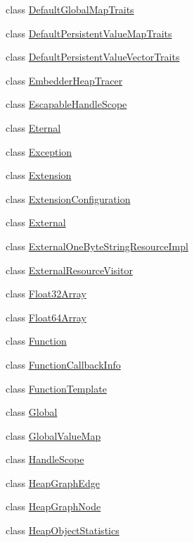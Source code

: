 \begin{DoxyCompactItemize}
\item 
class \hyperlink{classv8_1_1DefaultGlobalMapTraits}{Default\+Global\+Map\+Traits}
\item 
class \hyperlink{classv8_1_1DefaultPersistentValueMapTraits}{Default\+Persistent\+Value\+Map\+Traits}
\item 
class \hyperlink{classv8_1_1DefaultPersistentValueVectorTraits}{Default\+Persistent\+Value\+Vector\+Traits}
\item 
class \hyperlink{classv8_1_1EmbedderHeapTracer}{Embedder\+Heap\+Tracer}
\item 
class \hyperlink{classv8_1_1EscapableHandleScope}{Escapable\+Handle\+Scope}
\item 
class \hyperlink{classv8_1_1Eternal}{Eternal}
\item 
class \hyperlink{classv8_1_1Exception}{Exception}
\item 
class \hyperlink{classv8_1_1Extension}{Extension}
\item 
class \hyperlink{classv8_1_1ExtensionConfiguration}{Extension\+Configuration}
\item 
class \hyperlink{classv8_1_1External}{External}
\item 
class \hyperlink{classv8_1_1ExternalOneByteStringResourceImpl}{External\+One\+Byte\+String\+Resource\+Impl}
\item 
class \hyperlink{classv8_1_1ExternalResourceVisitor}{External\+Resource\+Visitor}
\item 
class \hyperlink{classv8_1_1Float32Array}{Float32\+Array}
\item 
class \hyperlink{classv8_1_1Float64Array}{Float64\+Array}
\item 
class \hyperlink{classv8_1_1Function}{Function}
\item 
class \hyperlink{classv8_1_1FunctionCallbackInfo}{Function\+Callback\+Info}
\item 
class \hyperlink{classv8_1_1FunctionTemplate}{Function\+Template}
\item 
class \hyperlink{classv8_1_1Global}{Global}
\item 
class \hyperlink{classv8_1_1GlobalValueMap}{Global\+Value\+Map}
\item 
class \hyperlink{classv8_1_1HandleScope}{Handle\+Scope}
\item 
class \hyperlink{classv8_1_1HeapGraphEdge}{Heap\+Graph\+Edge}
\item 
class \hyperlink{classv8_1_1HeapGraphNode}{Heap\+Graph\+Node}
\item 
class \hyperlink{classv8_1_1HeapObjectStatistics}{Heap\+Object\+Statistics}

\end{DoxyCompactItemize}
